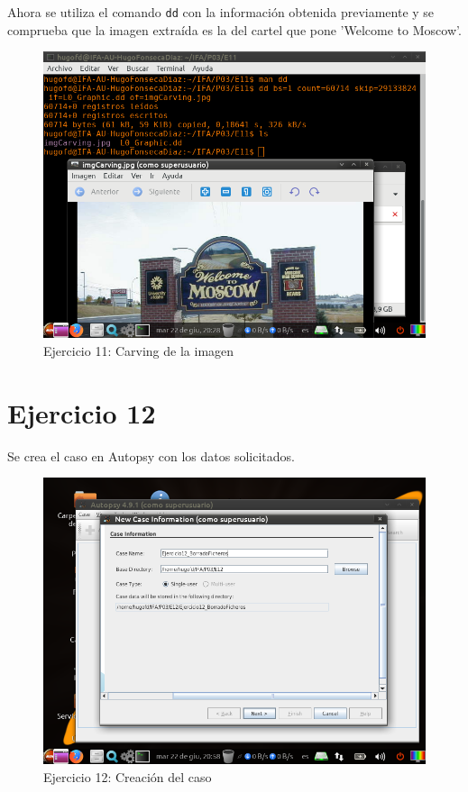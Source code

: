 \documentclass[11pt]{article}
\begin{document}
Ahora se utiliza el comando \verb|dd| con la información obtenida previamente y se comprueba que la imagen extraída es la del cartel que pone 'Welcome to Moscow'.

\begin{figure}[H]
    \caption{Ejercicio 11: Carving de la imagen}
    \centering
    \includegraphics[scale=0.7]{e11-4.png}
\end{figure}

\section{Ejercicio 12}
Se crea el caso en Autopsy con los datos solicitados.

\begin{figure}[H]
    \caption{Ejercicio 12: Creación del caso}
    \centering
    \includegraphics[scale=0.7]{e12-1.png}
\end{figure}
\end{document}
